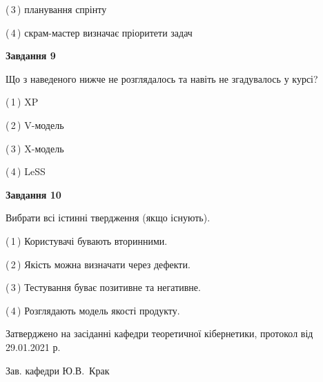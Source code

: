 \documentclass[10pt, ukrainian]{article}
\begin{document}
{\begin {large}
(\,3\,) планування спрінту%



(\,4\,) скрам-мастер визначає пріоритети задач%


{\begin {center}\textbf{Завдання 9}\end {center}}\par
Що з наведеного нижче не розглядалось та навіть не згадувалось у курсі?\par
\vspace{2mm}



(\,1\,) XP%



(\,2\,) V-модель%



(\,3\,) X-модель%



(\,4\,) LeSS%


{\begin {center}\textbf{Завдання 10}\end {center}}\par
Вибрати всі істинні твердження (якщо існують).\par
\vspace{2mm}



(\,1\,) Користувачі бувають вторинними.%



(\,2\,) Якість можна визначати через дефекти.%



(\,3\,) Тестування буває позитивне та негативне.%



(\,4\,) Розглядають модель якості продукту.%



\end {large}}
{\vspace{5mm}\smallskip \begin {small} Затверджено на засіданні кафедри теоретичної кібернетики, протокол  від   29.01.2021 р.\par\smallskip\smallskip
{\parbox {6.5 cm}{Зав. кафедри \dotfill Ю.В.~Крак}} \end{small}}
\newpage
\end{document}
